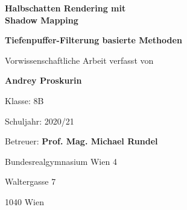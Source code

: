 \begin{titlepage}
    \centering
    \Large

    \vspace*{\fill}
    
    {\Huge\textbf{Halbschatten Rendering mit\\ Shadow Mapping}\par}
    \vspace{0.5cm}
    {\LARGE\textbf{Tiefenpuffer-Filterung basierte Methoden}}
    
    \vspace{3cm}
    
    Vorwissenschaftliche Arbeit verfasst von\par
    \textbf{Andrey Proskurin}\par
    
    \vspace{1.5cm}
    
    Klasse: 8B\par
    Schuljahr: 2020/21\par
    
    \vspace{1.5cm}
    
    Betreuer: \textbf{Prof. Mag. Michael Rundel}\par
    
    \vspace{3cm}
    
    Bundesrealgymnasium Wien 4\par
    Waltergasse 7\par
    1040 Wien
    
    \vspace*{\fill}
\end{titlepage}